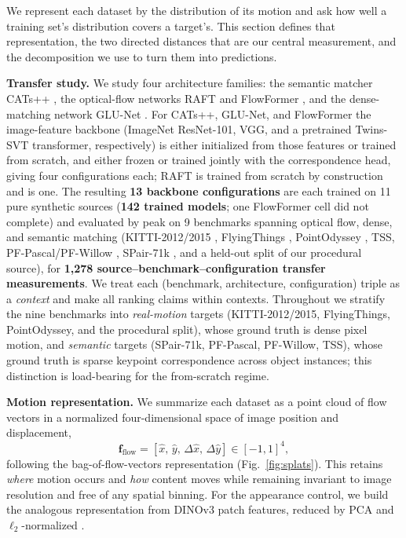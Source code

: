 \documentclass[runningheads]{llncs}
\begin{document}
We represent each dataset by the distribution of its motion and ask how well a
training set's distribution covers a target's. This section defines that
representation, the two directed distances that are our central measurement,
and the decomposition we use to turn them into predictions.

\noindent\textbf{Transfer study.}
We study four architecture families: the semantic matcher CATs++
\cite{cho2022cats++}, the optical-flow networks RAFT \cite{teed2020raft} and
FlowFormer \cite{huang2022flowformer}, and the dense-matching network GLU-Net
\cite{truong2020glunet}. For CATs++, GLU-Net, and FlowFormer the image-feature
backbone (ImageNet ResNet-101, VGG, and a pretrained Twins-SVT transformer,
respectively) is either initialized from those features or trained from
scratch, and either frozen or trained jointly with the correspondence head,
giving four configurations each; RAFT is trained from scratch by construction
and is one. The resulting \textbf{13 backbone configurations} are each trained
on 11 pure synthetic sources (\textbf{142 trained models}; one FlowFormer cell
did not complete) and evaluated by peak  on 9 benchmarks spanning
optical flow, dense, and semantic matching (KITTI-2012/2015 \cite{kitti_flow},
FlyingThings \cite{mayer2016FlyingThingsDataset}, PointOdyssey
\cite{pointodyssey}, TSS, PF-Pascal/PF-Willow \cite{pfpascal}, SPair-71k
\cite{spair71k}, and a held-out split of our procedural source), for
\textbf{1{,}278 source--benchmark--configuration transfer measurements}. We
treat each (benchmark, architecture, configuration) triple as a \emph{context}
and make all ranking claims within contexts. Throughout we stratify the nine
benchmarks into \emph{real-motion} targets (KITTI-2012/2015, FlyingThings,
PointOdyssey, and the procedural split), whose ground truth is dense pixel
motion, and \emph{semantic} targets (SPair-71k, PF-Pascal, PF-Willow, TSS),
whose ground truth is sparse keypoint correspondence across object instances;
this distinction is load-bearing for the from-scratch regime.

\noindent\textbf{Motion representation.}
We summarize each dataset as a point cloud of flow vectors in a normalized
four-dimensional space of image position and displacement,
\begin{equation}
\mathbf{f}_{\text{flow}} = [\hat{x},\, \hat{y},\, \Delta\hat{x},\,
\Delta\hat{y}] \in [-1,1]^4,
\label{eq:bfv}
\end{equation}
following the bag-of-flow-vectors representation (Fig.~\ref{fig:splats}). This
retains \emph{where} motion occurs and \emph{how} content moves while remaining
invariant to image resolution and free of any spatial binning. For the
appearance control, we build the analogous representation from DINOv3 patch
features, reduced by PCA and $\ell_2$-normalized \cite{simeoni2025dinov3}.
\end{document}
